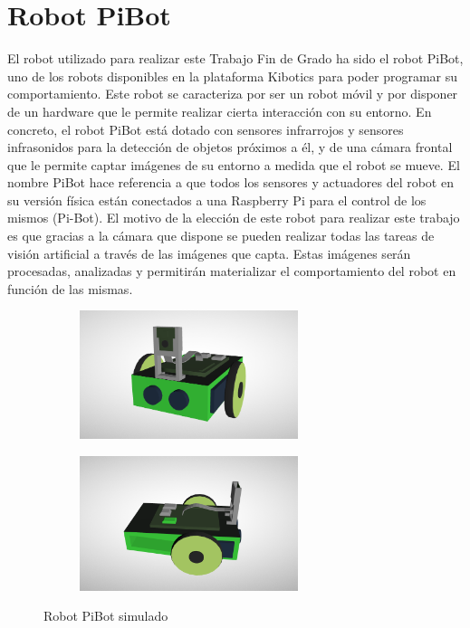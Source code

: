 \documentclass{report}
\begin{document}
\section{Robot PiBot}
El robot utilizado para realizar este Trabajo Fin de Grado ha sido el robot PiBot, uno de los robots disponibles en la plataforma Kibotics para poder programar su comportamiento. Este robot se caracteriza por ser un robot móvil y por disponer de un hardware que le permite realizar cierta interacción con su entorno. En concreto, el robot PiBot está dotado con sensores infrarrojos y sensores infrasonidos para la detección de objetos próximos a él, y de una cámara frontal que le permite captar imágenes de su entorno a medida que el robot se mueve. El nombre PiBot hace referencia a que todos los sensores y actuadores del robot en su versión física están conectados a una Raspberry Pi para el control de los mismos (Pi-Bot). El motivo de la elección de este robot para realizar este trabajo es que gracias a la cámara que dispone se pueden realizar todas las tareas de visión artificial a través de las imágenes que capta. Estas imágenes serán procesadas, analizadas y permitirán materializar el comportamiento del robot en función de las mismas.

\renewcommand{\figurename}{Figura}		
\begin{figure}[!h]
\centering
  \begin{subfigure}[b]{0.49\textwidth}
  \centering
    \includegraphics[width=0.7\textwidth, height=0.5\textwidth]{images/cap4/pibot-frontal.png}
    \label{fig:f1}
  \end{subfigure}
  \hfill
  \begin{subfigure}[b]{0.49\textwidth}
  \centering
    \includegraphics[width=0.7\textwidth, height=0.5\textwidth]{images/cap4/pibot-lateral.png}
    \label{fig:f2}
  \end{subfigure}
  \caption{Robot PiBot simulado}
\end{figure}
\end{document}
